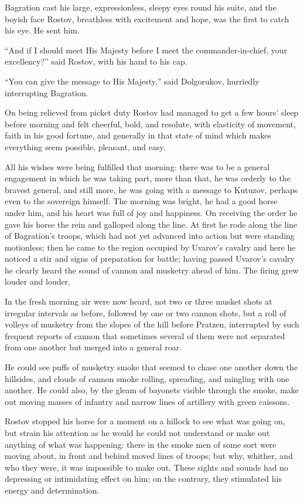 Bagration cast his large, expressionless, sleepy eyes round his
suite, and the boyish face Rostov, breathless with excitement and
hope, was the first to catch his eye. He sent him.

``And if I should meet His Majesty before I meet the
commander-in-chief, your excellency?'' said Rostov, with his hand
to his cap.

``You can give the message to His Majesty,'' said Dolgorukov,
hurriedly interrupting Bagration.

On being relieved from picket duty Rostov had managed to get a
few hours' sleep before morning and felt cheerful, bold, and
resolute, with elasticity of movement, faith in his good fortune,
and generally in that state of mind which makes everything seem
possible, pleasant, and easy.

All his wishes were being fulfilled that morning: there was to be
a general engagement in which he was taking part, more than that,
he was orderly to the bravest general, and still more, he was
going with a message to Kutuzov, perhaps even to the sovereign
himself. The morning was bright, he had a good horse under him,
and his heart was full of joy and happiness. On receiving the
order he gave his horse the rein and galloped along the line. At
first he rode along the line of Bagration's troops, which had not
yet advanced into action but were standing motionless; then he
came to the region occupied by Uvarov's cavalry and here he
noticed a stir and signs of preparation for battle; having passed
Uvarov's cavalry he clearly heard the sound of cannon and
musketry ahead of him. The firing grew louder and louder.

In the fresh morning air were now heard, not two or three musket
shots at irregular intervals as before, followed by one or two
cannon shots, but a roll of volleys of musketry from the slopes
of the hill before Pratzen, interrupted by such frequent reports
of cannon that sometimes several of them were not separated from
one another but merged into a general roar.

He could see puffs of musketry smoke that seemed to chase one
another down the hillsides, and clouds of cannon smoke rolling,
spreading, and mingling with one another. He could also, by the
gleam of bayonets visible through the smoke, make out moving
masses of infantry and narrow lines of artillery with green
caissons.

Rostov stopped his horse for a moment on a hillock to see what
was going on, but strain his attention as he would he could not
understand or make out anything of what was happening: there in
the smoke men of some sort were moving about, in front and behind
moved lines of troops; but why, whither, and who they were, it
was impossible to make out. These sights and sounds had no
depressing or intimidating effect on him; on the contrary, they
stimulated his energy and determination.

